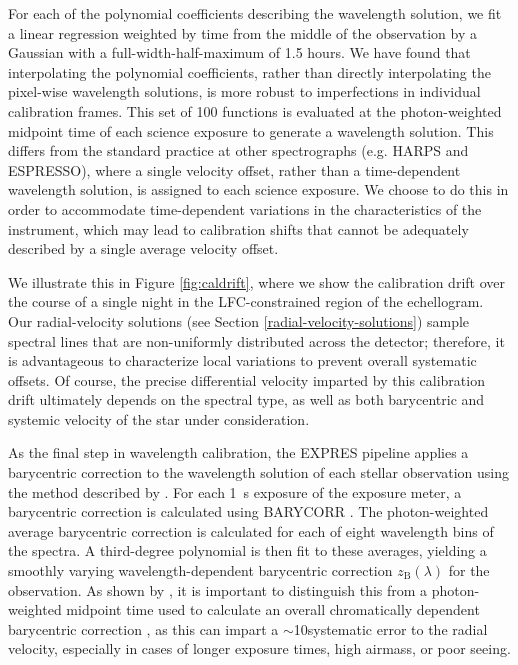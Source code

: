 For each of the polynomial coefficients describing the wavelength solution, we fit a linear regression weighted by time from the middle of the observation by a Gaussian with a full-width-half-maximum of 1.5 hours. We have found that interpolating the polynomial coefficients, rather than directly interpolating the pixel-wise wavelength solutions, is more robust to imperfections in individual calibration frames. This set of 100 functions is evaluated at the photon-weighted midpoint time of each science exposure to generate a wavelength solution. This differs from the standard practice at other spectrographs (e.g. HARPS and ESPRESSO), where a single velocity offset, rather than a time-dependent wavelength solution, is assigned to each science exposure. We choose to do this in order to accommodate time-dependent variations in the characteristics of the instrument, which may lead to calibration shifts that cannot be adequately described by a single average velocity offset.

We illustrate this in Figure \ref{fig:caldrift}, where we show the calibration drift over the course of a single night in the LFC-constrained region of the echellogram. Our radial-velocity solutions (see Section \ref{radial-velocity-solutions}) sample spectral lines that are non-uniformly distributed across the detector; therefore, it is advantageous to characterize local variations to prevent overall systematic offsets. Of course, the precise differential velocity imparted by this calibration drift ultimately depends on the spectral type, as well as both barycentric and systemic velocity of the star under consideration.

As the final step in wavelength calibration, the EXPRES pipeline applies a barycentric correction to the wavelength solution of each stellar observation using the method described by \citet{blackman_accounting_2017}. For each 1~s exposure of the exposure meter, a barycentric correction is calculated using BARYCORR \citep{wright_barycentric_2014}. The photon-weighted average barycentric correction is calculated for each of eight wavelength bins of the spectra. A third-degree polynomial is then fit to these averages, yielding a smoothly varying wavelength-dependent barycentric correction \(z_\text{B}(\lambda)\) for the observation. As shown by \citet{tronsgaard_photon-weighted_2019}, it is important to distinguish this from a photon-weighted midpoint time used to calculate an overall chromatically dependent barycentric correction \citep[e.g.,][]{landoni_espresso_2014}, as this can impart a $\sim$10\cms systematic error to the radial velocity, especially in cases of longer exposure times, high airmass, or poor seeing.

